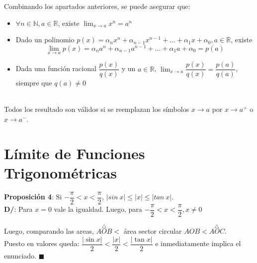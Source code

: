 \documentclass[11pt,a4paper]{article}
\newcommand\Base[1][0]{
\begin{scope}[xshift=#1]
\clip
  (-0.5,5.5) rectangle (5.5,-0.5);
  \draw[->]
  (-0.5,0) -- (5,0) node[right] {$u$};
\draw[->]
  (0,-0.5) -- (0,5) node[above] {$v$};
\coordinate (O) at (0,0) node[above left] {$O$};
\coordinate (aux1) at (40:4);
\coordinate (aux2) at (aux1|-0,0);
\coordinate (aux3) at (4,{4*tan(40)});
\node at (4.2, 0.2) {$A$};
\node at (3.1, 3) {$B$};
\node at (4.2, 3.7) {$C$};
\draw
  (O) -- (aux3) -- (aux3|-0,0)
  (aux1) -- (aux2);
\draw[thick,red!70!black] 
  (O) circle (4);
\pic[draw,"$x$",angle radius=30pt,angle eccentricity=1.2] {angle = aux2--O--aux1};   
\end{scope}  
}
\newcommand*{\QEDA}{\null\nobreak\hfill\ensuremath{\blacksquare}}
\begin{document}
Combinando los apartados anteriores, se puede asegurar que:
\begin{itemize}
\item $\forall n \in \mathbb{N}, a \in \mathbb{R}$, existe $\displaystyle{\lim_{x\to a} x^n = a^n}$
\item Dado un polinomio $p(x)=\alpha_nx^n+\alpha_{n-1}x^{n-1}+...+\alpha_1x+\alpha_0, a \in \mathbb{R}$, existe $$\lim_{x\to a}p(x) = \alpha_na^n+\alpha_{n-1}a^{n-1}+...+\alpha_1a+\alpha_0 = p(a)$$
\item Dada una funci\'on racional $\dfrac{p(x)}{q(x)}$ y un $a \in \mathbb{R}$, $\displaystyle{\lim_{x\to a}\dfrac{p(x)}{q(x)} = \dfrac{p(a)}{q(a)}}$, siempre que $q(a)\not = 0$\\ \\
\end{itemize}

Todos los resultado son v\'alidos si se reemplazan los s\'imbolos $x\rightarrow a$ por $x\rightarrow a^+$ o $x\rightarrow a^-$.

\newpage

\section{L\'imite de Funciones Trigonom\'etricas}
\noindent \textbf{Proposici\'on 4}: Si $-\dfrac{\pi}{2} < x < \dfrac{\pi}{2}$, $|sin\ x| \leq |x| \leq |tan\ x|$.\\
\noindent \textbf{D/}: Para $x=0$ vale la igualdad. Luego, para $-\dfrac{\pi}{2} < x < \dfrac{\pi}{2}, x \not = 0$

\hspace{-1.5cm}
\vspace{.1cm}
Luego, comparando las areas, $\overset{\triangle}{AOB} <$ \'area sector circular $AOB < \overset{\triangle}{AOC}$.\\
Puesto en valores queda: $\dfrac{|\sin x|}{2} < \dfrac{|x|}{2} < \dfrac{|\tan x|}{2}$ e inmediatamente implica el enunciado. \QEDA \\ \\
\end{document}
